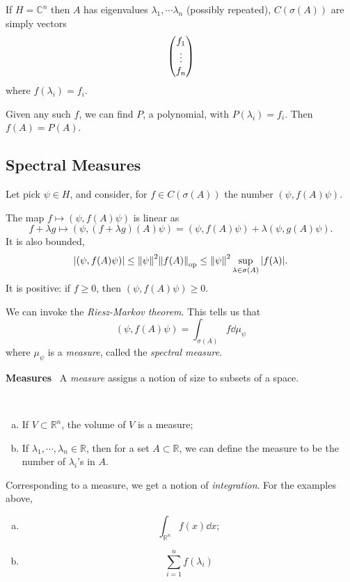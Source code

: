 \documentclass[a4paper,11pt]{article}
\begin{document}
	\begin{ex}
		If $H = \mathbb{C}^n$ then $A$ has eigenvalues $\lambda_1, \cdots \lambda_n$ (possibly repeated), $C(\sigma(A))$ are simply vectors 
		\[
			\mqty(f_1\\\vdots\\f_n)
		\]
		where $f(\lambda_i) = f_i$.

		Given any such $f$, we can find $P$, a polynomial, with $P(\lambda_i) = f_i$. Then $f(A) = P(A)$. 
	\end{ex}

	\subsection{Spectral Measures}

	Let pick $\psi \in H$, and consider, for $f \in C(\sigma(A))$ the number $(\psi, f(A) \psi)$. 
	
	The map $f \mapsto (\psi, f(A)\psi)$ is linear as $$f + \lambda g \mapsto (\psi, (f + \lambda g)(A) \psi) = (\psi, f(A) \psi) + \lambda (\psi, g(A)\psi).$$
	It is also bounded, 
	\[
		\abs{(\psi, f(A) \psi)} \leq \norm{\psi}^2 \norm{f(A)}_{\mathrm{op}} \leq \norm{\psi}^2 \sup _{\lambda \in \sigma(A)} \abs{f(\lambda)}.
	\]
	It is positive: if $f \geq 0$, then $(\psi, f(A)\psi) \geq 0$.

	We can invoke the \emph{Riesz-Markov theorem}. This tells us that 
	\[
		(\psi, f(A) \psi) = \int _{\sigma(A)} f \dd{\mu_\psi}
	\]
	where $\mu_\psi$ is a \emph{measure}, called the \emph{spectral measure}.

	\begin{framed}
		\textbf{Measures} \ A \emph{measure} assigns a notion of size to subsets of a space. 
		\begin{ex}
			\ 
			\begin{enumerate}[a)]
				\item If $V \subset \mathbb{R}^n$, the volume of $V$ is a measure;
				\item If $\lambda_1, \cdots, \lambda_n \in \mathbb{R}$, then for a set $A \subset \mathbb{R}$, we can define the measure to be the number of $\lambda_i$'s in $A$.
			\end{enumerate}
		\end{ex}

		Corresponding to a measure, we get a notion of \emph{integration}. For the examples above, 
		\begin{enumerate}[a)]
			\item \[
				\int _{\mathbb{R}^n} f(x) \dd{x};
			\]
			\item \[
				\sum _{i = 1}^{n} f(\lambda_i)
			\]
		\end{enumerate}
	\end{framed}
\end{document}
